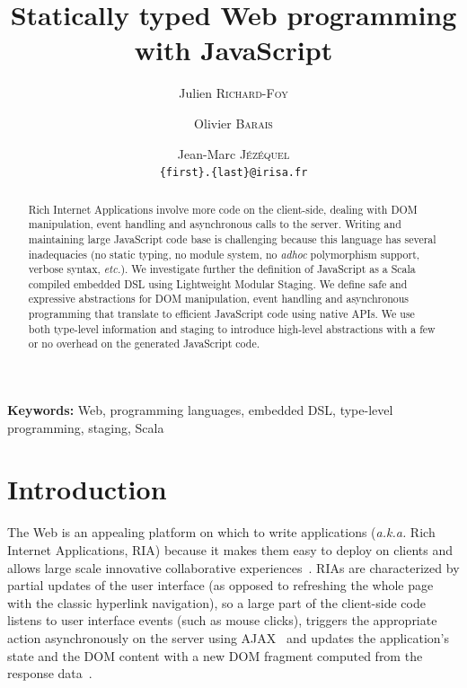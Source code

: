 \documentclass[american,english,runningheads]{llncs}
\newcommand{\etal}{\emph{et al.~}}
\newcommand{\etc}{\emph{etc.}}
\newcommand{\aka}{\emph{a.k.a.}}
\newcommand{\noun}[1]{\textsc{#1}}
\begin{document}
\title{Statically typed Web programming with JavaScript}

\author{Julien \noun{Richard-Foy} \and Olivier \noun{Barais} \and Jean-Marc \noun{Jézéquel}\\
\texttt{\{first\}.\{last\}@irisa.fr}}

\authorrunning{Julien \noun{Richard-Foy} \etal{}}

\maketitle


\begin{abstract}
Rich Internet Applications involve more code on the client-side, dealing with DOM manipulation, event handling and asynchronous calls to the server. Writing and maintaining large JavaScript code base is challenging because this language has several inadequacies (no static typing, no module system, no \emph{adhoc} polymorphism support, verbose syntax, \etc{}). We investigate further the definition of JavaScript as a Scala compiled embedded DSL using Lightweight Modular Staging. We define safe and expressive abstractions for DOM manipulation, event handling and asynchronous programming that translate to efficient JavaScript code using native APIs. We use both type-level information and staging to introduce high-level abstractions with a few or no overhead on the generated JavaScript code.
\end{abstract}

{\bf Keywords:} Web, programming languages, embedded DSL, type-level programming, staging, Scala

\section{Introduction}

The Web is an appealing platform on which to write applications (\aka{} Rich Internet Applications, RIA) because it makes them easy to deploy on clients and allows large scale innovative collaborative experiences~\cite{Farrell07_RIA,Mikkonen08_SpaghettiJs}. RIAs are characterized by partial updates of the user interface (as opposed to refreshing the whole page with the classic hyperlink navigation), so a large part of the client-side code listens to user interface events (such as mouse clicks), triggers the appropriate action asynchronously on the server using AJAX~\cite{Garrett05_Ajax} and updates the application’s state and the DOM content with a new DOM fragment computed from the response data~\cite{Farrell07_RIA,Busch09_StateOfArtRIA}.
\end{document}
